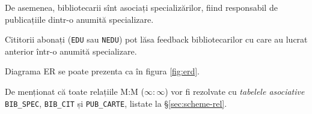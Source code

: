De asemenea, bibliotecarii sînt asociați specializărilor, fiind
responsabil de publicațiile dintr-o anumită specializare.

Cititorii abonați (\texttt{EDU} sau \texttt{NEDU}) pot lăsa feedback
bibliotecarilor cu care au lucrat anterior într-o anumită specializare.

Diagrama ER se poate prezenta ca în figura \ref{fig:erd}.

De menționat că toate relațiile M:M ($\infty : \infty$) vor fi rezolvate
cu \emph{tabelele asociative} \texttt{BIB\_SPEC}, \texttt{BIB\_CIT} și
\texttt{PUB\_CARTE}, listate la \S\ref{sec:scheme-rel}.



\newpage

